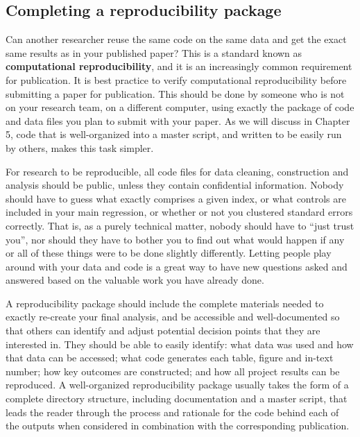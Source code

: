 \subsection{Completing a reproducibility package}
Can another researcher reuse the same code on the same data
and get the exact same results as in your published paper?
This is a standard known as \textbf{computational reproducibility},
and it is an increasingly common requirement for publication.
It is best practice to verify computational reproducibility before submitting a paper for publication.
This should be done by someone who is not on your research team, on a different computer,
using exactly the package of code and data files you plan to submit with your paper.
As we will discuss in Chapter 5,
code that is well-organized into a master script, and written to be easily run by others,
makes this task simpler.

For research to be reproducible,
all code files for data cleaning, construction and analysis
should be public, unless they contain confidential information.
Nobody should have to guess what exactly comprises a given index,
or what controls are included in your main regression,
or whether or not you clustered standard errors correctly.
That is, as a purely technical matter, nobody should have to ``just trust you'',
nor should they have to bother you to find out what would happen
if any or all of these things were to be done slightly differently.\cite{simmons2011false,simonsohn2015specification,wicherts2016degrees}
Letting people play around with your data and code
is a great way to have new questions asked and answered
based on the valuable work you have already done.

A reproducibility package should include the complete materials needed
to exactly re-create your final analysis,
and be accessible and well-documented so that others can identify
and adjust potential decision points that they are interested in.
They should be able to easily identify:
what data was used and how that data can be accessed;
what code generates each table, figure and in-text number;
how key outcomes are constructed;
and how all project results can be reproduced.
A well-organized reproducibility package usually takes the form
of a complete directory structure, including documentation and a master script,
that leads the reader through the process and rationale
for the code behind each of the outputs
when considered in combination with the corresponding publication.


